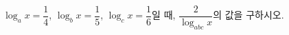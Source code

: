 $\log_a x=\dfrac{1}{4}$, $\log_b x=\dfrac{1}{5}$, $\log_c x=\dfrac{1}{6}$일 때, $\dfrac{2}{\log_{abc} x}$의 값을 구하시오.
